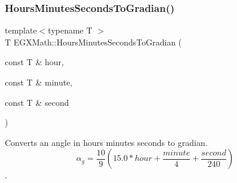\mbox{\label{group___e_g_x_math-_angle_conversions-_hours_minutes_seconds_ga1731e750f3e5561313ee9d22adff747e}} 
\subsubsection{\texorpdfstring{Hours\+Minutes\+Seconds\+To\+Gradian()}{HoursMinutesSecondsToGradian()}}
{\footnotesize\ttfamily template$<$typename T $>$ \\
T E\+G\+X\+Math\+::\+Hours\+Minutes\+Seconds\+To\+Gradian (\begin{DoxyParamCaption}\item[{const T \&}]{hour,  }\item[{const T \&}]{minute,  }\item[{const T \&}]{second }\end{DoxyParamCaption})}



Converts an angle in hours minutes seconds to gradian. \[\alpha_{g}=\frac{10}{9}(15.0 * hour + \frac{minute}{4} + \frac{second}{240})\]. 

